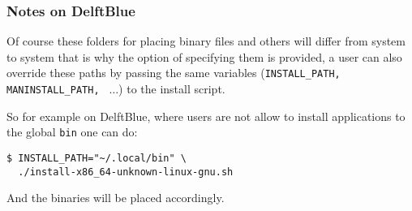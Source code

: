 \subsubsection{Notes on DelftBlue}
\label{sec:installexample2}

Of course these folders for placing binary files and others will differ from system to system
that is why the option of specifying them is provided, a user can also override these paths by
passing the same variables (\texttt{INSTALL\_PATH, MANINSTALL\_PATH, } $\dots$) to the install script.

So for example on DelftBlue, where users are not allow to install applications
to the global \texttt{bin} one can do:

\begin{verbatim}
$ INSTALL_PATH="~/.local/bin" \
  ./install-x86_64-unknown-linux-gnu.sh
\end{verbatim}

And the binaries will be placed accordingly.
